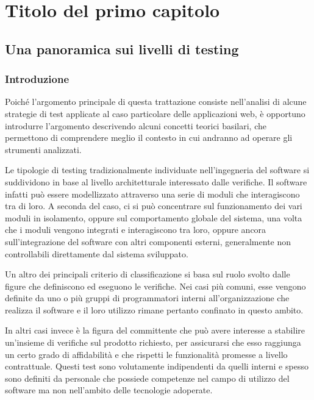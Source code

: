 \chapter{Titolo del primo capitolo}

\section{Una panoramica sui livelli di testing}

\subsection{Introduzione}

Poiché l'argomento principale di questa trattazione consiste nell'analisi di alcune strategie di test applicate al caso particolare delle applicazioni web, è opportuno introdurre l'argomento descrivendo alcuni concetti teorici basilari, che permettono di comprendere meglio il contesto in cui andranno ad operare gli strumenti analizzati.

Le tipologie di testing tradizionalmente individuate nell'ingegneria del software si suddividono in base al livello architetturale interessato dalle verifiche.
Il software infatti può essere modellizzato attraverso una serie di moduli che interagiscono tra di loro. A seconda del caso, ci si può concentrare sul funzionamento dei vari moduli in isolamento, oppure sul comportamento globale del sistema, una volta che i moduli vengono integrati e interagiscono tra loro, oppure ancora sull'integrazione del software con altri componenti esterni, generalmente non controllabili direttamente dal sistema sviluppato.

Un altro dei principali criterio di classificazione si basa sul ruolo svolto dalle figure che definiscono ed eseguono le verifiche. Nei casi più comuni, esse vengono definite da uno o più gruppi di programmatori interni all'organizzazione che realizza il software e il loro utilizzo rimane pertanto confinato in questo ambito.

In altri casi invece è la figura del committente che può avere interesse a stabilire un'insieme di verifiche sul prodotto richiesto, per assicurarsi che esso raggiunga un certo grado di affidabilità e che rispetti le funzionalità promesse a livello contrattuale. Questi test sono volutamente indipendenti da quelli interni e spesso sono definiti da personale che possiede competenze nel campo di utilizzo del software ma non nell'ambito delle tecnologie adoperate. 

